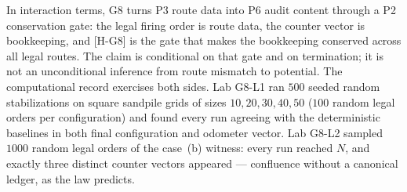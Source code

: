 \documentclass[11pt]{article}
\theoremstyle{definition}
\begin{document}
In interaction terms, G8 turns P3 route data into P6 audit content through a P2 conservation gate: the
legal firing order is route data, the counter vector is bookkeeping, and \textup{[H-G8]} is the gate
that makes the bookkeeping conserved across all legal routes. The claim is conditional on that gate
and on termination; it is not an unconditional inference from route mismatch to potential. The
computational record exercises both sides. Lab G8-L1 ran $500$ seeded random stabilizations on square
sandpile grids of sizes $10, 20, 30, 40, 50$ ($100$ random legal orders per configuration) and found
every run agreeing with the deterministic baselines in both final configuration and odometer vector.
Lab G8-L2 sampled $1000$ random legal orders of the case~(b) witness: every run reached $N$, and
exactly three distinct counter vectors appeared --- confluence without a canonical ledger, as the law
predicts.
\end{document}
